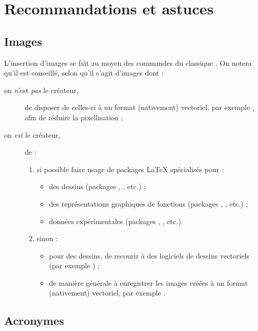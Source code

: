 
\chapter{Recommandations et astuces}
\label{cha:recomm-et-astuc}

\section{Images}

L'insertion d'images se fait au moyen des commandes du classique
. On notera qu'il est conseillé, selon qu'il s'agit d'images
dont :
\begin{description}
\item[on \emph{n'}est \emph{pas} le créateur,] de disposer de celles-ci à un
  format (nativement) vectoriel, par exemple \pdf, afin de réduire la
  pixellisation ;
\item[on \emph{est} le créateur,] de :
  \begin{enumerate}
  \item si possible faire usage de packages \LaTeX{} spécialisés pour :
    \begin{itemize}
    \item des dessins (packages , , etc.) ;
    \item des représentations graphiques de fonctions (packages
      , , etc.) ;
    \item données expérimentales (packages ,
      , etc.)
    \end{itemize}
  \item sinon :
    \begin{itemize}
    \item pour des dessins, de recourir à des logiciels de dessins vectoriels
      (par exemple ) ;
    \item de manière générale à enregistrer les images créées à un format
      (nativement) vectoriel, par exemple \pdf.
    \end{itemize}
  \end{enumerate}
\end{description}

\section{Acronymes}\label{acronymes}

